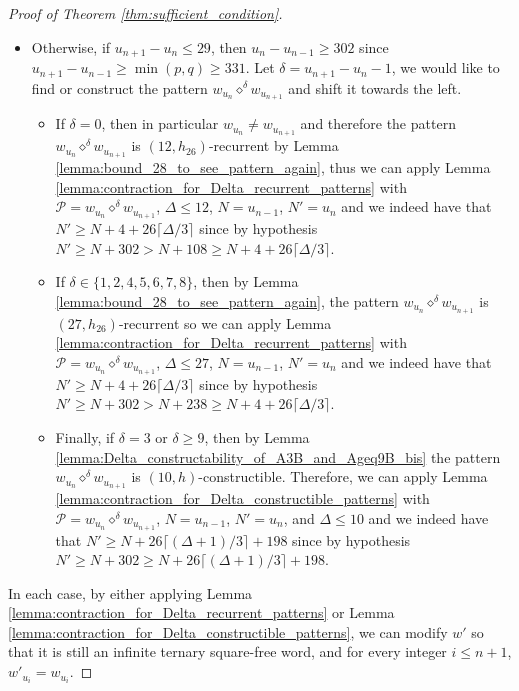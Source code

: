 \documentclass[12pt]{article}
\theoremstyle{definition}
\newcommand{\patternprime}[3]{{#1}\diamond^{#2}{#3}}
\begin{document}
\begin{proof}[Proof of Theorem \ref{thm:sufficient_condition}]
\begin{itemize}
    \item Otherwise, if $u_{n + 1} - u_{n} \le 29$, then $u_n - u_{n - 1} \ge 302$ since $u_{n + 1} - u_{n - 1} \ge \min(p, q) \ge 331$. Let $\delta = u_{n + 1} - u_n - 1$, we would like to find or construct the pattern $\patternprime{w_{u_n}}{\delta}{w_{u_{n + 1}}}$ and shift it towards the left. 
    \begin{itemize}
        \item If $\delta = 0$, then in particular $w_{u_n}\neq w_{u_{n + 1}}$ and therefore the pattern $\patternprime{w_{u_n}}{\delta}{w_{u_{n + 1}}}$ is $(12, h_{26})$-recurrent by Lemma \ref{lemma:bound_28_to_see_pattern_again}, thus we can apply Lemma \ref{lemma:contraction_for_Delta_recurrent_patterns} with $\mathcal{P} = \patternprime{w_{u_n}}{\delta}{w_{u_{n + 1}}}$, $\Delta \leq 12$, $N = u_{n - 1}$, $N' = u_{n}$ and we indeed have that $N' \ge N + 4 + 26\lceil\Delta/3\rceil$ since by hypothesis $N' \ge N + 302>N+108\ge N+4 + 26\lceil\Delta/3\rceil$.
        \item If $\delta \in \{1, 2, 4, 5, 6, 7, 8\}$, then by Lemma \ref{lemma:bound_28_to_see_pattern_again}, the pattern $\patternprime{w_{u_n}}{\delta}{w_{u_{n + 1}}}$ is $(27, h_{26})$-recurrent so we can apply Lemma \ref{lemma:contraction_for_Delta_recurrent_patterns} with $\mathcal{P} = \patternprime{w_{u_n}}{\delta}{w_{u_{n + 1}}}$, $\Delta \leq 27$, $N = u_{n - 1}$, $N' = u_{n}$ and we indeed have that $N' \ge N + 4 + 26\lceil\Delta/3\rceil$ since by hypothesis $N' \ge N + 302>N+238\ge N+4 + 26\lceil\Delta/3\rceil$.
        \item Finally, if $\delta = 3$ or $\delta \ge 9$, then by Lemma \ref{lemma:Delta_constructability_of_A3B_and_Ageq9B_bis} the pattern $\patternprime{w_{u_n}}{\delta}{w_{u_{n + 1}}}$ is $(10, h)$-constructible. Therefore, we can apply Lemma \ref{lemma:contraction_for_Delta_constructible_patterns} with $\mathcal{P} = \patternprime{w_{u_n}}{\delta}{w_{u_{n + 1}}}$, $N = u_{n - 1}$, $N' = u_n$, and $\Delta \leq 10$ and we indeed have that $N' \ge N + 26\lceil(\Delta+1)/3\rceil +198$ since by hypothesis $N' \ge N + 302\ge N+26\lceil(\Delta+1)/3\rceil + 198$.
    \end{itemize}
\end{itemize}
In each case, by either applying Lemma \ref{lemma:contraction_for_Delta_recurrent_patterns} or Lemma \ref{lemma:contraction_for_Delta_constructible_patterns}, we can modify $w'$ so that it is still  an infinite ternary square-free word, and for every integer $i \le n + 1$, $w'_{u_i} = w_{u_i}$.
\end{proof}
\end{document}
